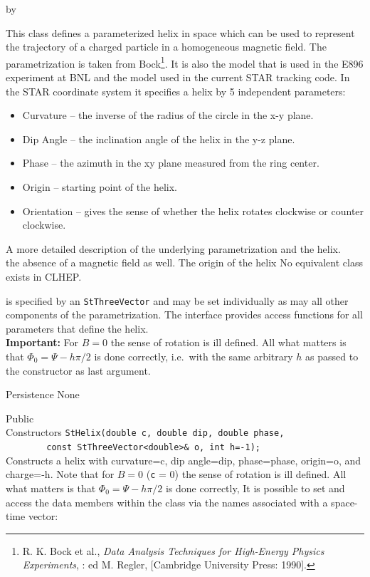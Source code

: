 \documentclass[twoside]{article}
\newcommand{\comp}[1]{\texttt{#1}}%
\newcommand{\entrylabel}[1]{\mbox{\textbf{{#1}}}\hfil}%
\newenvironment{entry}
{\begin{list}{}%
    {\renewcommand{\makelabel}{\entrylabel}%
     \setlength{\labelwidth}{90pt}%
     \setlength{\leftmargin}{\labelwidth}
     \advance\leftmargin by \labelsep%
      }%
    }%
  {\end{list}}
\newcommand{\Entrylabel}[1]%
{\raisebox{0pt}[1ex][0pt]{\makebox[\labelwidth][l]%
    {\parbox[t]{\labelwidth}{\hspace{0pt}\textbf{{#1}}}}}}
\newenvironment{Entry}%
{\renewcommand{\entrylabel}{\Entrylabel}\begin{entry}}%
  {\end{entry}}
\begin{document}
\begin{description}
\begin{Entry}
    This class defines a parameterized helix in space which can be
    used to represent the trajectory of a charged particle in a
    homogeneous magnetic field.  The parametrization is taken from
    Bock\footnote{R. K. Bock et al., {\em Data Analysis Techniques for High-Energy Physics Experiments},
      : ed M. Regler, [Cambridge University Press: 1990]. }.
    It is also the model that is used in
    the E896 experiment at BNL and the model used in the current
    STAR tracking code.  In the STAR coordinate system it specifies
    a helix by 5 independent parameters:
    \begin{itemize}
      \item Curvature -- the inverse of the radius of the circle in the
        x-y plane.
      \item Dip Angle -- the inclination angle of the helix in the y-z plane.
      \item Phase -- the azimuth in the xy plane measured from the ring center.
      \item Origin -- starting point of the helix.
      \item Orientation -- gives the sense of whether the helix rotates
        clockwise or counter clockwise.
    \end{itemize}
    A more detailed description of the underlying parametrization and
    the helix.\\
    the absence of a magnetic field as well.  The origin of the helix
    No equivalent class exists in CLHEP.

    is specified by an \comp{StThreeVector} and may be set
    individually as may all other components of the parametrization.
    The interface provides access functions for all parameters that define
    the helix. \\
    \textbf{Important:} For $B = 0$ the sense of rotation is ill defined.
    All what matters is that $\Phi_0 = \Psi - h \pi/2$ is done correctly,
    i.e.~with the same arbitrary $h$ as passed to the constructor as last
    argument. 

    
\item[Persistence]
    None


\item[Public\\ Constructors]
    \verb+StHelix(double c, double dip, double phase,+\\
    \verb+        const StThreeVector<double>& o, int h=-1);+ \\
    Constructs a helix with curvature=c, dip angle=dip, phase=phase,
    origin=o, and charge=-h.
    Note that for $B = 0$ (\texttt{c} = 0) the sense of rotation is ill defined.
    All what matters is that $\Phi_0 = \Psi - h \pi/2$ is done correctly,
  It is possible to set and access the data members within the class
  via the names associated with a space-time vector:
    

\end{Entry}
\end{description}
\end{document}
